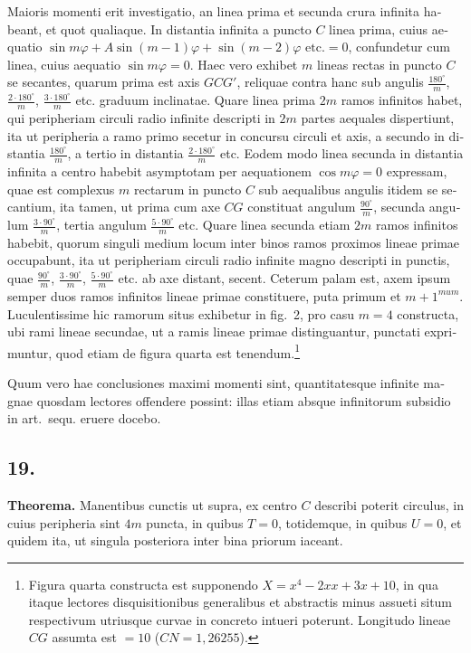 \documentclass[12pt,a4paper]{article}
\begin{document}
\begin{otherlanguage}{latin}
Maioris momenti erit investigatio, an linea prima et secunda crura infinita habeant, et quot qualiaque. In distantia infinita a puncto $C$ linea prima, cuius aequatio $\sin m\varphi+A\sin(m-1)\varphi+\sin(m-2)\varphi\text{ etc.}=0$, confundetur cum linea, cuius aequatio $\sin m\varphi=0$. Haec vero exhibet $m$ lineas rectas in puncto $C$ se secantes, quarum prima est axis $GCG'$, reliquae contra hanc sub angulis $\frac{180^{\circ}}{m}$, $\frac{2\cdot180^{\circ}}{m}$, $\frac{3\cdot180^{\circ}}{m}$ etc. graduum inclinatae. Quare linea prima $2m$ ramos infinitos habet, qui peripheriam circuli radio infinite descripti in $2m$ partes aequales dispertiunt, ita ut peripheria a ramo primo secetur in concursu circuli et axis, a secundo in distantia $\frac{180^{\circ}}{m}$, a tertio in distantia $\frac{2\cdot180^{\circ}}{m}$ etc. Eodem modo linea secunda in distantia infinita a centro habebit asymptotam per aequationem $\cos m\varphi=0$ expressam, quae est complexus $m$ rectarum in puncto $C$ sub aequalibus angulis itidem se secantium, ita tamen, ut prima cum axe $CG$ constituat angulum $\frac{90^{\circ}}{m}$, secunda angulum $\frac{3\cdot90^{\circ}}{m}$, tertia angulum $\frac{5\cdot90^{\circ}}{m}$ etc. Quare linea secunda etiam $2m$ ramos infinitos habebit, quorum singuli medium locum inter binos ramos proximos lineae primae occupabunt, ita ut peripheriam circuli radio infinite magno descripti in punctis, quae $\frac{90^{\circ}}{m}$, $\frac{3\cdot90^{\circ}}{m}$, $\frac{5\cdot90^{\circ}}{m}$ etc. ab axe distant, secent. Ceterum palam est, axem ipsum semper duos ramos infinitos lineae primae constituere, puta primum et $m+1^{mum}$. Luculentissime hic ramorum situs exhibetur in fig.~2, pro casu $m=4$ constructa, ubi rami lineae secundae, ut a ramis lineae primae distinguantur, punctati exprimuntur, quod etiam de figura quarta est tenendum.\footnote{Figura quarta constructa est supponendo $X=x^{4}-2xx+3x+10$, in qua itaque lectores disquisitionibus generalibus et abstractis minus assueti situm respectivum utriusque curvae in concreto intueri poterunt. Longitudo lineae $CG$ assumta est $=10$ ($CN=1{,}26255$).}

Quum vero hae conclusiones maximi momenti sint, quantitatesque infinite magnae quosdam lectores offendere possint: illas etiam absque infinitorum subsidio in art.~sequ. eruere docebo.

\subsection*{19.}
\textbf{Theorema.} Manentibus cunctis ut supra, ex centro $C$ describi poterit circulus, in cuius peripheria sint $4m$ puncta, in quibus $T=0$, totidemque, in quibus $U=0$, et quidem ita, ut singula posteriora inter bina priorum iaceant.


\end{otherlanguage}
\end{document}
